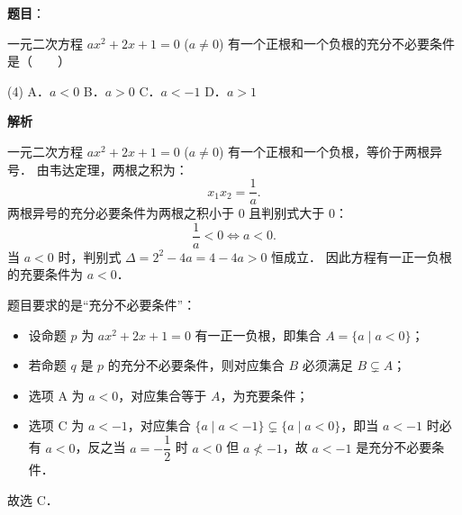 \begin{answer}

\textbf{题目}：

一元二次方程 $ax^2 + 2x + 1 = 0$ ($a \neq 0$) 有一个正根和一个负根的充分不必要条件是\mbox{（　　）}

\begin{gkopts}(4)
\task A．$a < 0$
\task B．$a > 0$
\task C．$a < -1$
\task D．$a > 1$
\end{gkopts}

\textbf{解析}

一元二次方程 $ax^2 + 2x + 1 = 0$ ($a \neq 0$) 有一个正根和一个负根，等价于两根异号．
由韦达定理，两根之积为：
\nopagebreak[4]
\[
x_1 x_2 = \frac{1}{a}.
\]
两根异号的充分必要条件为两根之积小于 $0$ 且判别式大于 $0$：
\nopagebreak[4]
\[
\frac{1}{a} < 0 \iff a < 0.
\]
当 $a < 0$ 时，判别式 $\Delta = 2^2 - 4a = 4 - 4a > 0$ 恒成立．
因此方程有一正一负根的充要条件为 $a < 0$．

题目要求的是“充分不必要条件”：
\begin{itemize}
\item 设命题 $p$ 为 $ax^2 + 2x + 1 = 0$ 有一正一负根，即集合 $A = \{a \mid a < 0\}$；
\item 若命题 $q$ 是 $p$ 的充分不必要条件，则对应集合 $B$ 必须满足 $B \subsetneq A$；
\item 选项 A 为 $a < 0$，对应集合等于 $A$，为充要条件；
\item 选项 C 为 $a < -1$，对应集合 $\{a \mid a < -1\} \subsetneq \{a \mid a < 0\}$，即当 $a < -1$ 时必有 $a < 0$，反之当 $a = -\dfrac{1}{2}$ 时 $a < 0$ 但 $a \not< -1$，故 $a < -1$ 是充分不必要条件．
\end{itemize}

故选 C．


\end{answer}

